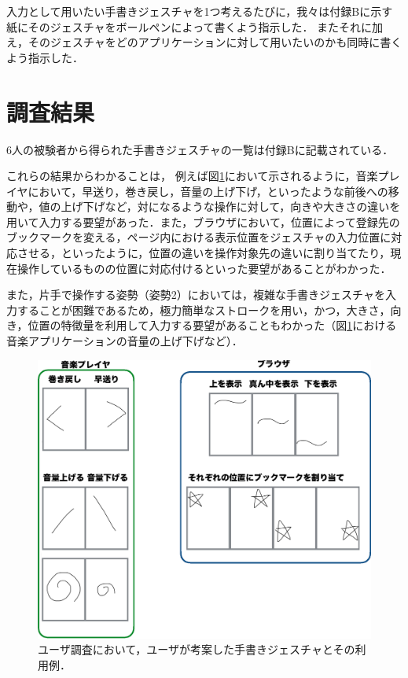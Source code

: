 入力として用いたい手書きジェスチャを1つ考えるたびに，我々は付録Bに示す紙にそのジェスチャをボールペンによって書くよう指示した．
またそれに加え，そのジェスチャをどのアプリケーションに対して用いたいのかも同時に書くよう指示した．


\section{調査結果}
6人の被験者から得られた手書きジェスチャの一覧は付録Bに記載されている．

これらの結果からわかることは，
例えば図\ref{user}において示されるように，音楽プレイヤにおいて，早送り，巻き戻し，音量の上げ下げ，といったような前後への移動や，値の上げ下げなど，対になるような操作に対して，向きや大きさの違いを用いて入力する要望があった．また，ブラウザにおいて，位置によって登録先のブックマークを変える，ページ内における表示位置をジェスチャの入力位置に対応させる，といったように，位置の違いを操作対象先の違いに割り当てたり，現在操作しているものの位置に対応付けるといった要望があることがわかった．

また，片手で操作する姿勢（姿勢2）においては，複雑な手書きジェスチャを入力することが困難であるため，極力簡単なストロークを用い，かつ，大きさ，向き，位置の特徴量を利用して入力する要望があることもわかった（図\ref{user}における音楽アプリケーションの音量の上げ下げなど）．

\begin{figure} [t]
 \begin{center}
  \includegraphics [width=0.8\columnwidth]{img/elicitation_example.eps}
  \caption{ユーザ調査において，ユーザが考案した手書きジェスチャとその利用例．}
  \label{user}
 \end{center}
\end{figure}

